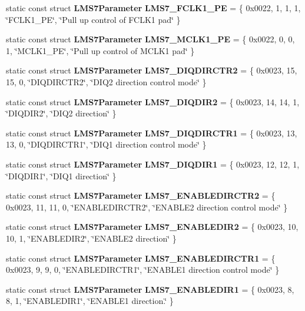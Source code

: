 \begin{DoxyCompactItemize}
\item 
static const struct {\bf L\+M\+S7\+Parameter} {\bf L\+M\+S7\+\_\+\+F\+C\+L\+K1\+\_\+\+PE} = \{ 0x0022, 1, 1, 1, \char`\"{}\+F\+C\+L\+K1\+\_\+\+P\+E\char`\"{}, \char`\"{}\+Pull up control of F\+C\+L\+K1 pad\char`\"{} \}
\item 
static const struct {\bf L\+M\+S7\+Parameter} {\bf L\+M\+S7\+\_\+\+M\+C\+L\+K1\+\_\+\+PE} = \{ 0x0022, 0, 0, 1, \char`\"{}\+M\+C\+L\+K1\+\_\+\+P\+E\char`\"{}, \char`\"{}\+Pull up control of M\+C\+L\+K1 pad\char`\"{} \}
\item 
static const struct {\bf L\+M\+S7\+Parameter} {\bf L\+M\+S7\+\_\+\+D\+I\+Q\+D\+I\+R\+C\+T\+R2} = \{ 0x0023, 15, 15, 0, \char`\"{}\+D\+I\+Q\+D\+I\+R\+C\+T\+R2\char`\"{}, \char`\"{}\+D\+I\+Q2 direction control mode\char`\"{} \}
\item 
static const struct {\bf L\+M\+S7\+Parameter} {\bf L\+M\+S7\+\_\+\+D\+I\+Q\+D\+I\+R2} = \{ 0x0023, 14, 14, 1, \char`\"{}\+D\+I\+Q\+D\+I\+R2\char`\"{}, \char`\"{}\+D\+I\+Q2 direction\char`\"{} \}
\item 
static const struct {\bf L\+M\+S7\+Parameter} {\bf L\+M\+S7\+\_\+\+D\+I\+Q\+D\+I\+R\+C\+T\+R1} = \{ 0x0023, 13, 13, 0, \char`\"{}\+D\+I\+Q\+D\+I\+R\+C\+T\+R1\char`\"{}, \char`\"{}\+D\+I\+Q1 direction control mode\char`\"{} \}
\item 
static const struct {\bf L\+M\+S7\+Parameter} {\bf L\+M\+S7\+\_\+\+D\+I\+Q\+D\+I\+R1} = \{ 0x0023, 12, 12, 1, \char`\"{}\+D\+I\+Q\+D\+I\+R1\char`\"{}, \char`\"{}\+D\+I\+Q1 direction\char`\"{} \}
\item 
static const struct {\bf L\+M\+S7\+Parameter} {\bf L\+M\+S7\+\_\+\+E\+N\+A\+B\+L\+E\+D\+I\+R\+C\+T\+R2} = \{ 0x0023, 11, 11, 0, \char`\"{}\+E\+N\+A\+B\+L\+E\+D\+I\+R\+C\+T\+R2\char`\"{}, \char`\"{}\+E\+N\+A\+B\+L\+E2 direction control mode\char`\"{} \}
\item 
static const struct {\bf L\+M\+S7\+Parameter} {\bf L\+M\+S7\+\_\+\+E\+N\+A\+B\+L\+E\+D\+I\+R2} = \{ 0x0023, 10, 10, 1, \char`\"{}\+E\+N\+A\+B\+L\+E\+D\+I\+R2\char`\"{}, \char`\"{}\+E\+N\+A\+B\+L\+E2 direction\char`\"{} \}
\item 
static const struct {\bf L\+M\+S7\+Parameter} {\bf L\+M\+S7\+\_\+\+E\+N\+A\+B\+L\+E\+D\+I\+R\+C\+T\+R1} = \{ 0x0023, 9, 9, 0, \char`\"{}\+E\+N\+A\+B\+L\+E\+D\+I\+R\+C\+T\+R1\char`\"{}, \char`\"{}\+E\+N\+A\+B\+L\+E1 direction control mode\char`\"{} \}
\item 
static const struct {\bf L\+M\+S7\+Parameter} {\bf L\+M\+S7\+\_\+\+E\+N\+A\+B\+L\+E\+D\+I\+R1} = \{ 0x0023, 8, 8, 1, \char`\"{}\+E\+N\+A\+B\+L\+E\+D\+I\+R1\char`\"{}, \char`\"{}\+E\+N\+A\+B\+L\+E1 direction.\char`\"{} \}

\end{DoxyCompactItemize}
